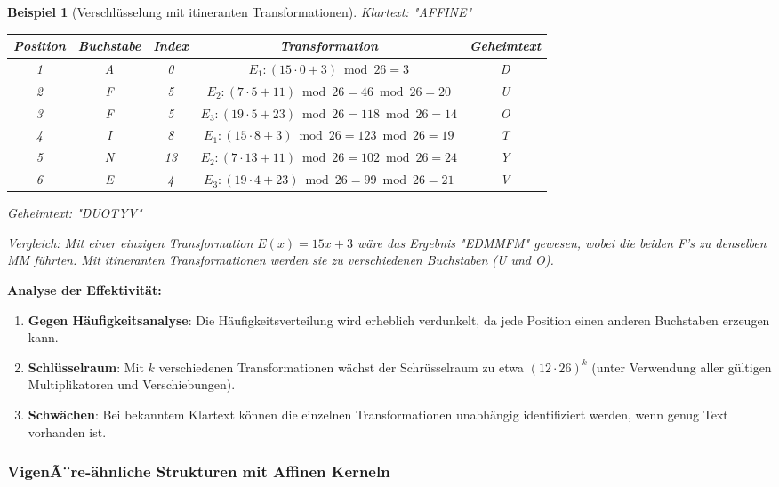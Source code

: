 ﻿\documentclass[12pt,a4paper]{article}
\newtheorem{example}{Beispiel}
\begin{document}
	\begin{example}[Verschlüsselung mit itineranten Transformationen]
		Klartext: "AFFINE"
		
		\begin{center}
			\small
			\begin{tabular}{|c|c|c|c|c|}
				\hline
				\textbf{Position} & \textbf{Buchstabe} & \textbf{Index} & \textbf{Transformation} & \textbf{Geheimtext} \\
				\hline
				1 & A & 0 & $E_1: (15 \cdot 0 + 3) \bmod 26 = 3$ & D \\
				2 & F & 5 & $E_2: (7 \cdot 5 + 11) \bmod 26 = 46 \bmod 26 = 20$ & U \\
				3 & F & 5 & $E_3: (19 \cdot 5 + 23) \bmod 26 = 118 \bmod 26 = 14$ & O \\
				4 & I & 8 & $E_1: (15 \cdot 8 + 3) \bmod 26 = 123 \bmod 26 = 19$ & T \\
				5 & N & 13 & $E_2: (7 \cdot 13 + 11) \bmod 26 = 102 \bmod 26 = 24$ & Y \\
				6 & E & 4 & $E_3: (19 \cdot 4 + 23) \bmod 26 = 99 \bmod 26 = 21$ & V \\
				\hline
			\end{tabular}
		\end{center}
		
		Geheimtext: "DUOTYV"
		
		Vergleich: Mit einer einzigen Transformation $E(x) = 15x + 3$ wäre das Ergebnis "EDMMFM" gewesen, wobei die beiden F's zu denselben MM führten. Mit itineranten Transformationen werden sie zu verschiedenen Buchstaben (U und O).
	\end{example}
	
	\textbf{Analyse der Effektivität:}
	\begin{enumerate}
		\item \textbf{Gegen Häufigkeitsanalyse}: Die Häufigkeitsverteilung wird erheblich verdunkelt, da jede Position einen anderen Buchstaben erzeugen kann.
		\item \textbf{Schlüsselraum}: Mit $k$ verschiedenen Transformationen wächst der Schrüsselraum zu etwa $(12 \cdot 26)^k$ (unter Verwendung aller gültigen Multiplikatoren und Verschiebungen).
		\item \textbf{Schwächen}: Bei bekanntem Klartext können die einzelnen Transformationen unabhängig identifiziert werden, wenn genug Text vorhanden ist.
	\end{enumerate}
	
	\subsubsection{VigenÃ¨re-ähnliche Strukturen mit Affinen Kerneln}
	
\end{document}
